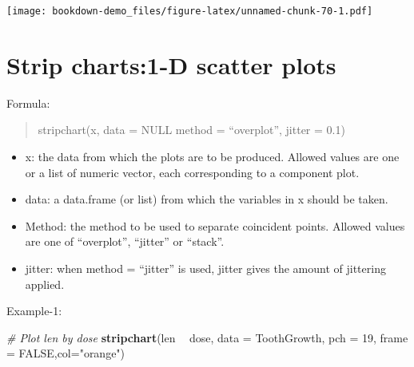 \documentclass[]{book}
\newenvironment{Shaded}{\begin{snugshade}}{\end{snugshade}}
\newcommand{\KeywordTok}[1]{\textcolor[rgb]{0.13,0.29,0.53}{\textbf{#1}}}
\newcommand{\DataTypeTok}[1]{\textcolor[rgb]{0.13,0.29,0.53}{#1}}
\newcommand{\DecValTok}[1]{\textcolor[rgb]{0.00,0.00,0.81}{#1}}
\newcommand{\StringTok}[1]{\textcolor[rgb]{0.31,0.60,0.02}{#1}}
\newcommand{\CommentTok}[1]{\textcolor[rgb]{0.56,0.35,0.01}{\textit{#1}}}
\newcommand{\OtherTok}[1]{\textcolor[rgb]{0.56,0.35,0.01}{#1}}
\newcommand{\OperatorTok}[1]{\textcolor[rgb]{0.81,0.36,0.00}{\textbf{#1}}}
\newcommand{\NormalTok}[1]{#1}
\providecommand{\tightlist}{%
  \setlength{\itemsep}{0pt}\setlength{\parskip}{0pt}}
\begin{document}
\begin{Shaded}
\end{Shaded}

\texttt{[image: bookdown-demo\_files/figure-latex/unnamed-chunk-70-1.pdf]}

\chapter{Strip charts:1-D scatter
plots}\label{strip-charts1-d-scatter-plots}

Formula:

\begin{quote}
stripchart(x, data = NULL method = ``overplot'', jitter = 0.1)
\end{quote}

\begin{itemize}
\tightlist
\item
  x: the data from which the plots are to be produced. Allowed values
  are one or a list of numeric vector, each corresponding to a component
  plot.
\item
  data: a data.frame (or list) from which the variables in x should be
  taken.
\item
  Method: the method to be used to separate coincident points. Allowed
  values are one of ``overplot'', ``jitter'' or ``stack''.
\item
  jitter: when method = ``jitter'' is used, jitter gives the amount of
  jittering applied.
\end{itemize}

Example-1:

\begin{Shaded}
\begin{Highlighting}[]
\CommentTok{# Plot len by dose}
\KeywordTok{stripchart}\NormalTok{(len }\OperatorTok{~}\StringTok{ }\NormalTok{dose, }\DataTypeTok{data =}\NormalTok{ ToothGrowth,}
         \DataTypeTok{pch =} \DecValTok{19}\NormalTok{, }\DataTypeTok{frame =} \OtherTok{FALSE}\NormalTok{,}\DataTypeTok{col=}\StringTok{"orange"}\NormalTok{)}
\end{Highlighting}
\end{Shaded}
\end{document}
